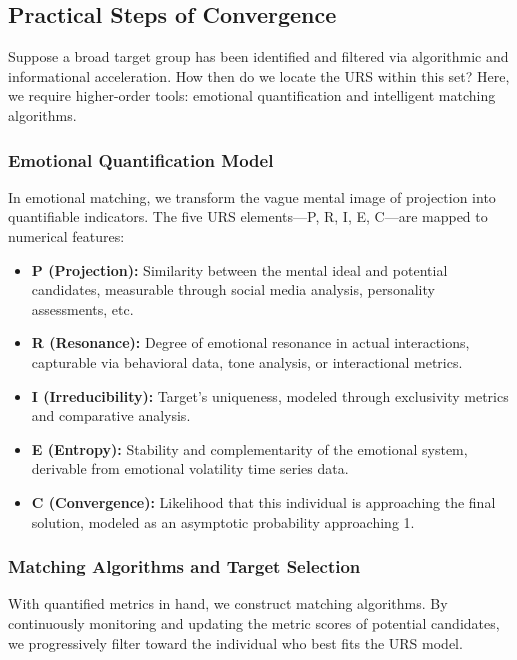 \documentclass[12pt]{article}
\begin{document}
\subsection{Practical Steps of Convergence}

Suppose a broad target group has been identified and filtered via algorithmic and informational acceleration. How then do we locate the URS within this set? Here, we require higher-order tools: emotional quantification and intelligent matching algorithms.

\subsubsection{Emotional Quantification Model}

In emotional matching, we transform the vague mental image of projection into quantifiable indicators. The five URS elements—P, R, I, E, C—are mapped to numerical features:

\begin{itemize}
  \item \textbf{P (Projection):} Similarity between the mental ideal and potential candidates, measurable through social media analysis, personality assessments, etc.
  \item \textbf{R (Resonance):} Degree of emotional resonance in actual interactions, capturable via behavioral data, tone analysis, or interactional metrics.
  \item \textbf{I (Irreducibility):} Target’s uniqueness, modeled through exclusivity metrics and comparative analysis.
  \item \textbf{E (Entropy):} Stability and complementarity of the emotional system, derivable from emotional volatility time series data.
  \item \textbf{C (Convergence):} Likelihood that this individual is approaching the final solution, modeled as an asymptotic probability approaching 1.
\end{itemize}

\subsubsection{Matching Algorithms and Target Selection}

With quantified metrics in hand, we construct matching algorithms. By continuously monitoring and updating the metric scores of potential candidates, we progressively filter toward the individual who best fits the URS model.
\end{document}
